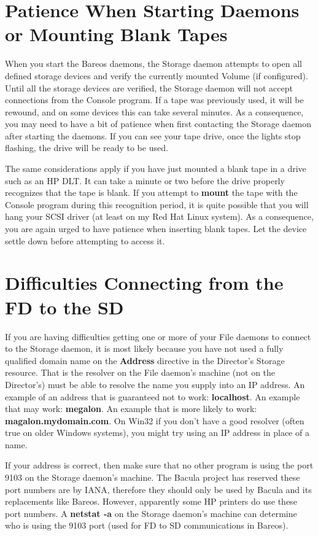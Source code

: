 \section{Patience When Starting Daemons or Mounting Blank Tapes}

When you start the Bareos daemons, the Storage daemon attempts to open all
defined storage devices and verify the currently mounted Volume (if
configured). Until all the storage devices are verified, the Storage daemon
will not accept connections from the Console program. If a tape was previously
used, it will be rewound, and on some devices this can take several minutes.
As a consequence, you may need to have a bit of patience when first contacting
the Storage daemon after starting the daemons. If you can see your tape drive,
once the lights stop flashing, the drive will be ready to be used.

The same considerations apply if you have just mounted a blank tape in a drive
such as an HP DLT. It can take a minute or two before the drive properly
recognizes that the tape is blank. If you attempt to {\bf mount} the tape with
the Console program during this recognition period, it is quite possible that
you will hang your SCSI driver (at least on my Red Hat Linux system). As a
consequence, you are again urged to have patience when inserting blank tapes.
Let the device settle down before attempting to access it.

\section{Difficulties Connecting from the FD to the SD}

If you are having difficulties getting one or more of your File daemons to
connect to the Storage daemon, it is most likely because you have not used a
fully qualified domain name on the {\bf Address} directive in the
Director's Storage resource. That is the resolver on the File daemon's machine
(not on the Director's) must be able to resolve the name you supply into an IP
address. An example of an address that is guaranteed not to work: {\bf
localhost}. An example that may work: {\bf megalon}. An example that is more
likely to work: {\bf magalon.mydomain.com}. On Win32 if you don't have a good
resolver (often true on older Windows systems), you might try using an IP
address in place of a name.

If your address is correct, then make sure that no other program is using the
port 9103 on the Storage daemon's machine. The Bacula project has reserved 
these port numbers are by IANA, therefore they should only be used by Bacula and its replacements like Bareos.
However, apparently
some HP printers do use these port numbers. A {\bf netstat -a} on the Storage
daemon's machine can determine who is using the 9103 port (used for FD to SD
communications in Bareos).



